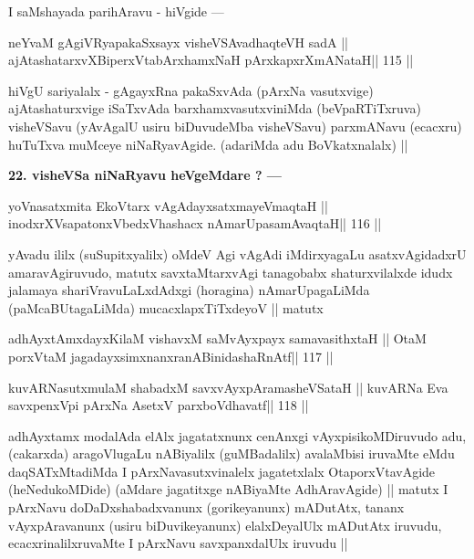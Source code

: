 \begin{artha}
I saMshayada parihAravu - hiVgide ---
\end{artha}

\begin{shl}
neYvaM gAgiVRyapakaSxsayx visheVSAvadhaqteVH sadA ||
ajAtashatarxvXBiperxVtabArxhamxNaH pArxkapxrXmANataH\hfill || 115 ||
\end{shl}

\begin{artha}
hiVgU sariyalalx - gAgayxRna pakaSxvAda (pArxNa vasutxvige) ajAtashaturxvige iSaTxvAda barxhamxvasutxviniMda (beVpaRTiTxruva) visheVSavu (yAvAgalU usiru biDuvudeMba visheVSavu) parxmANavu (ecacxru) huTuTxva muMceye niNaRyavAgide. (adariMda adu BoVkatxnalalx) ||
\end{artha}

\begin{artha}
{\bf 22. visheVSa niNaRyavu heVgeMdare ? ---}
\end{artha}

\begin{shl}
yoV\s nasatxmita EkoV\s tarx vAgAdayxsatxmayeV\s maqtaH ||
inodxrXV\s sapatonxV\s bedxVhashacx nAmarUpasamAvaqtaH\hfill || 116 ||
\end{shl}

\begin{artha}
yAvadu ililx (suSupitxyalilx) oMdeV Agi vAgAdi iMdirxyagaLu asatxvAgidadxrU amaravAgiruvudo, matutx savxtaMtarxvAgi tanagobabx shaturxvilalxde idudx jalamaya shariVravuLaLxdAdxgi (horagina) nAmarUpagaLiMda (paMcaBUtagaLiMda) mucacxlapxTiTxdeyoV || matutx
\end{artha}

\begin{shl}
adhAyxtAmxdayxKilaM vishavxM saMvAyxpayx samavasithxtaH ||
OtaM porxVtaM jagadayxsimxnanxranABinidashaRnAtf\hfill || 117 ||
\end{shl}

\begin{shl}
kuvARNasutxmulaM shabadxM savxvAyxpAramasheVSataH ||
kuvARNa Eva savxpenxV\s pi pArxNa AsetxV parxboVdhavatf\hfill || 118 ||
\end{shl}

\begin{artha}
adhAyxtamx modalAda elAlx jagatatxnunx cenAnxgi vAyxpisikoMDiruvudo adu, (cakarxda) aragoVlugaLu nABiyalilx (guMBadalilx) avalaMbisi iruvaMte eMdu daqSATxMtadiMda I pArxNavasutxvinalelx jagatetxlalx OtaporxVtavAgide (heNedukoMDide) (aMdare jagatitxge nABiyaMte AdhAravAgide) || matutx I pArxNavu doDaDxshabadxvanunx (gorikeyanunx) mADutAtx, tananx vAyxpAravanunx (usiru biDuvikeyanunx) elalxDeyalUlx mADutAtx iruvudu, ecacxrinalilxruvaMte I pArxNavu savxpanxdalUlx iruvudu ||
\end{artha}

